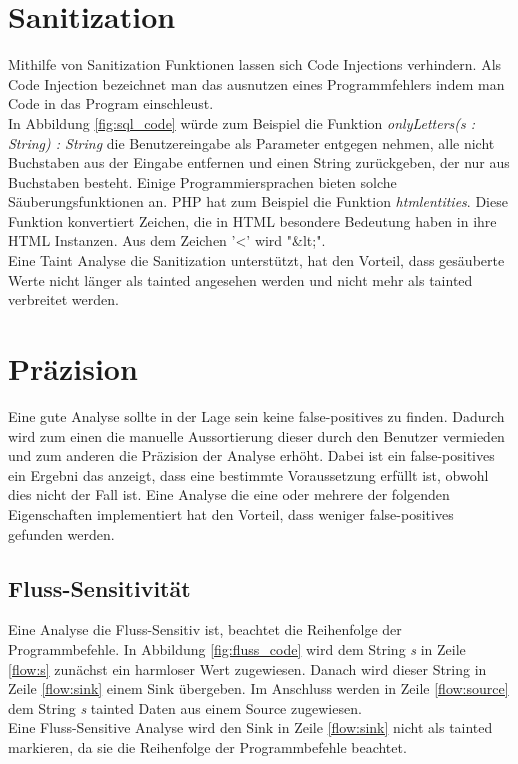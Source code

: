 \documentclass[runningheads]{llncs}
\begin{document}
\section{Sanitization}
Mithilfe von Sanitization Funktionen lassen sich Code Injections verhindern. Als Code Injection bezeichnet man das ausnutzen eines Programmfehlers indem man Code in das Program einschleust.
\\In Abbildung \ref{fig:sql_code} würde zum Beispiel die Funktion \emph{onlyLetters(s : String) : String} die Benutzereingabe als Parameter entgegen nehmen, alle nicht Buchstaben aus der Eingabe entfernen und einen String zurückgeben, der nur aus Buchstaben besteht. Einige Programmiersprachen bieten solche Säuberungsfunktionen an. PHP hat zum Beispiel die Funktion \emph{htmlentities}. Diese Funktion konvertiert Zeichen, die in HTML besondere Bedeutung haben in ihre HTML Instanzen. Aus dem Zeichen '\textless' wird "\&lt;".\\
Eine Taint Analyse die Sanitization unterstützt, hat den Vorteil, dass gesäuberte Werte nicht länger als tainted angesehen werden und nicht mehr als tainted verbreitet werden.

\section{Präzision}\label{sec:precision}
Eine gute Analyse sollte in der Lage sein keine false-positives zu finden. Dadurch wird zum einen die manuelle Aussortierung dieser durch den Benutzer vermieden und zum anderen die Präzision der Analyse erhöht. Dabei ist ein false-positives ein Ergebni das anzeigt, dass eine bestimmte Voraussetzung erfüllt ist, obwohl dies nicht der Fall ist. Eine Analyse die eine oder mehrere der folgenden Eigenschaften implementiert hat den Vorteil, dass weniger false-positives gefunden werden.

\subsection{Fluss-Sensitivität}
Eine Analyse die Fluss-Sensitiv ist, beachtet die Reihenfolge der Programmbefehle.
In Abbildung \ref{fig:fluss_code} wird dem String \emph{s} in Zeile \ref{flow:s} zunächst ein harmloser Wert zugewiesen. Danach wird dieser String in Zeile \ref{flow:sink} einem Sink übergeben. Im Anschluss werden in Zeile \ref{flow:source} dem String \emph{s} tainted Daten aus einem Source zugewiesen. \\
Eine Fluss-Sensitive Analyse wird den Sink in Zeile \ref{flow:sink} nicht als tainted markieren, da sie die Reihenfolge der Programmbefehle beachtet. 
\end{document}
